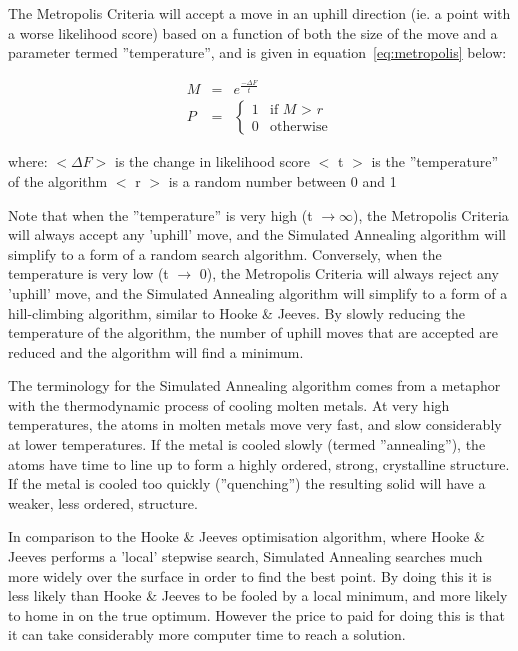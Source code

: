 \documentclass[10pt,twoside]{book}
\begin{document}
\bigskip
The Metropolis Criteria will accept a move in an uphill direction (ie. a point with a worse likelihood score) based on a function of both the size of the move and a parameter termed ''temperature'', and is given in equation~\ref{eq:metropolis} below:

\begin{eqnarray}\label{eq:metropolis}
M & = & e^{\displaystyle \frac{-\Delta F} {t}} \nonumber \\
P & = &
\begin{cases}
1 & \textrm{if $M$ > $r$} \\
0 & \textrm{otherwise}
\end{cases}
\end{eqnarray}

where:\newline
$<\Delta F>$ is the change in likelihood score\newline
$<$ t $>$ is the ''temperature'' of the algorithm\newline
$<$ r $>$ is a random number between 0 and 1

\bigskip
Note that when the ''temperature'' is very high (t $\rightarrow \infty$), the Metropolis Criteria will always accept any 'uphill' move, and the Simulated Annealing algorithm will simplify to a form of a random search algorithm.  Conversely, when the temperature is very low (t $\rightarrow$ 0), the Metropolis Criteria will always reject any 'uphill' move, and the Simulated Annealing algorithm will simplify to a form of a hill-climbing algorithm, similar to Hooke \& Jeeves.  By slowly reducing the temperature of the algorithm, the number of uphill moves that are accepted are reduced and the algorithm will find a minimum.

\bigskip
The terminology for the Simulated Annealing algorithm comes from a metaphor with the thermodynamic process of cooling molten metals.  At very high temperatures, the atoms in molten metals move very fast, and slow considerably at lower temperatures.  If the metal is cooled slowly (termed ''annealing''), the atoms have time to line up to form a highly ordered, strong, crystalline structure.  If the metal is cooled too quickly (''quenching'') the resulting solid will have a weaker, less ordered, structure.

\bigskip
In comparison to the Hooke \& Jeeves optimisation algorithm, where Hooke \& Jeeves performs a 'local' stepwise search, Simulated Annealing searches much more widely over the surface in order to find the best point.  By doing this it is less likely than Hooke \& Jeeves to be fooled by a local minimum, and more likely to home in on the true optimum.  However the price to paid for doing this is that it can take considerably more computer time to reach a solution.
\end{document}
